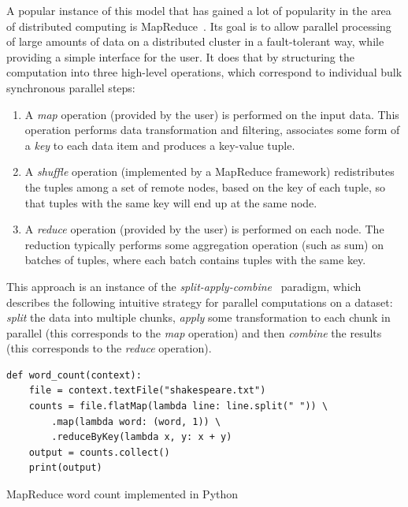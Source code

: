 A popular instance of this model that has gained a lot of popularity in the area of distributed
computing is MapReduce~\cite{mapreduce}. Its goal is to allow parallel processing of large
amounts of data on a distributed cluster in a fault-tolerant way, while providing a simple
interface for the user. It does that by structuring the computation into three high-level
operations, which correspond to individual bulk synchronous parallel steps:
\begin{enumerate}[itemsep=0pt,topsep=4pt]
	\item A \emph{map} operation (provided by the user) is performed on the input data. This
	      operation performs data transformation and filtering, associates some form of a
	      \emph{key} to each data item and produces a key-value tuple.
	\item A \emph{shuffle} operation (implemented by a MapReduce framework) redistributes the tuples
	      among a set of remote nodes, based on the key of each tuple, so that tuples with the same key will
	      end up at the same node.
	\item A \emph{reduce} operation (provided by the user) is performed on each node. The reduction
	      typically performs some aggregation operation (such as sum) on batches of tuples, where each batch
	      contains tuples with the same key.
\end{enumerate}

This approach is an instance of the \emph{split-apply-combine}~\cite{split_apply_combine} paradigm, which
describes the following intuitive strategy for parallel computations on a dataset:
\emph{split} the data into multiple chunks, \emph{apply} some transformation
to each chunk in parallel (this corresponds to the \emph{map} operation) and then
\emph{combine} the results (this corresponds to the \emph{reduce} operation).

\begin{listing}
	\begin{verbatim}
def word_count(context):
	file = context.textFile("shakespeare.txt")
	counts = file.flatMap(lambda line: line.split(" ")) \
		.map(lambda word: (word, 1)) \
		.reduceByKey(lambda x, y: x + y)
	output = counts.collect()
	print(output)
	\end{verbatim}
	\caption{MapReduce word count implemented in Python}
	\label{lst:wordcount-example}
\end{listing}

